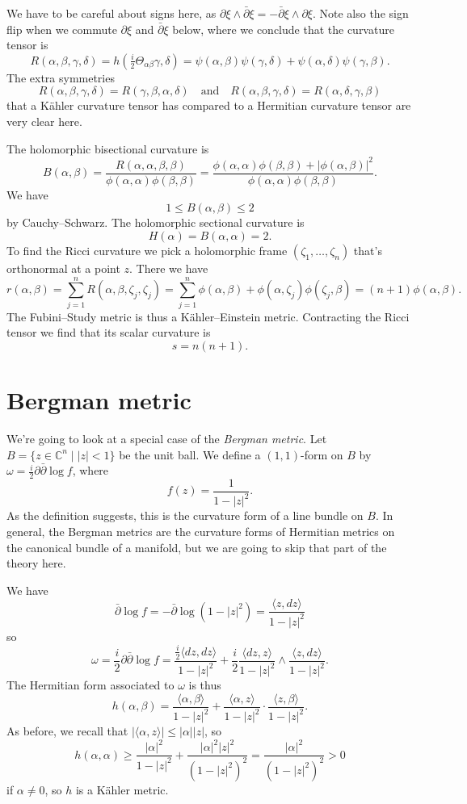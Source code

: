 \documentclass[11pt]{article}
\newcommand{\kk}[1]{\mathbb{#1}}
\begin{document}
We have to be careful about signs here, as $\partial \xi \wedge \bar\partial \xi = - \bar\partial \xi \wedge \partial \xi$. Note also the sign flip when we commute $\partial\xi$ and $\bar\partial\xi$ below, where we conclude that the curvature tensor is
$$
R(\alpha,\beta,\gamma,\delta)
= h(\tfrac i2\Theta_{\alpha \beta} \gamma, \delta)
= \psi(\alpha, \beta) \psi(\gamma, \delta)
+ \psi(\alpha, \delta) \psi(\gamma, \beta).
$$
The extra symmetries
$$
R(\alpha,\beta,\gamma,\delta) = R(\gamma,\beta,\alpha,\delta)
\quad\text{and}\quad
R(\alpha,\beta,\gamma,\delta) = R(\alpha,\delta,\gamma,\beta)
$$
that a K\"ahler curvature tensor has compared to a Hermitian curvature tensor are very clear here.


The holomorphic bisectional curvature is
$$
B(\alpha,\beta) = \frac{R(\alpha,\alpha,\beta,\beta)}{\phi(\alpha,\alpha)\phi(\beta,\beta)}
= \frac{\phi(\alpha,\alpha)\phi(\beta,\beta)+|\phi(\alpha,\beta)|^2}{\phi(\alpha,\alpha)\phi(\beta,\beta)}.
$$
We have
$$
1 \leq B(\alpha,\beta) \leq 2
$$
by Cauchy--Schwarz. The holomorphic sectional curvature is
$$
H(\alpha) = B(\alpha,\alpha) = 2.
$$
To find the Ricci curvature we pick a holomorphic frame $(\zeta_1, \ldots, \zeta_n)$ that's orthonormal at a point $z$. There we have
$$
r(\alpha,\beta)
= \sum_{j=1}^n R(\alpha,\beta,\zeta_j,\zeta_j)
= \sum_{j=1}^n \phi(\alpha,\beta) + \phi(\alpha,\zeta_j)\phi(\zeta_j,\beta)
= (n+1) \phi(\alpha,\beta).
$$
The Fubini--Study metric is thus a K\"ahler--Einstein metric. Contracting the Ricci tensor we find that its scalar curvature is
$$
s = n(n+1).
$$




\section{Bergman metric}
\label{sec:org21fa1aa}

We're going to look at a special case of the \emph{Bergman metric}. Let $B = \{ z \in \kk C^n \mid |z|<1 \}$ be the unit ball. We define a $(1,1)$-form on $B$ by $\omega = \frac i2 \partial \bar \partial \log f$, where
$$
f(z) = \frac{1}{1-|z|^2}.
$$
As the definition suggests, this is the curvature form of a line bundle on $B$. In general, the Bergman metrics are the curvature forms of Hermitian metrics on the canonical bundle of a manifold, but we are going to skip that part of the theory here.

We have
$$
\bar\partial \log f
= - \bar\partial \log (1 -|z|^2)
= \frac{\langle z, dz\rangle}{1 - |z|^2}
$$
so
$$
\omega
= \frac i2 \partial\bar\partial \log f
= \frac{\frac i2 \langle dz, dz\rangle}{1-|z|^2}
+ \frac i2 \frac{\langle dz, z \rangle}{1-|z|^2}\wedge \frac{\langle z, dz \rangle}{1-|z|^2}.
$$
The Hermitian form associated to $\omega$ is thus
$$
h(\alpha,\beta)
=\frac{\langle \alpha, \beta\rangle}{1-|z|^2}
+ \frac{\langle \alpha, z \rangle}{1-|z|^2}
\cdot \frac{\langle z, \beta \rangle}{1-|z|^2}.
$$
As before, we recall that $|\langle \alpha, z \rangle| \leq |\alpha| |z|$, so
$$
h(\alpha,\alpha)
\geq \frac{|\alpha|^2}{1-|z|^2}
+ \frac{|\alpha|^2|z|^2}{(1-|z|^2)^2}
= \frac{|\alpha|^2}{(1-|z|^2)^2}
> 0
$$
if $\alpha \not= 0$, so $h$ is a K\"ahler metric.
\end{document}
